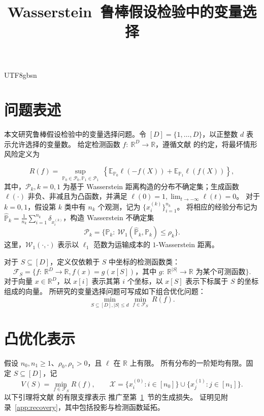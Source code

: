 \documentclass[11pt,a4paper]{article}
\title{\mbox{Wasserstein 鲁棒假设检验中的变量选择}}
\author{}
\date{}
\makeatletter
\theoremstyle{plain}
\renewcommand{\maketitle}{
\begin{center}
{\Large\bfseries\@title\par}
\end{center}\vspace{2pt}}
\makeatother
\begin{document}
\begin{CJK*}{UTF8}{gbsn}
\maketitle



\section{问题表述}\label{sec:problem}

本文研究鲁棒假设检验中的变量选择问题。令 $[D]=\{1,\ldots,D\}$，以正整数 $d$ 表示允许选择的变量数。
给定检测函数 $f:~\mathbb{R}^D\to\mathbb{R}$，遵循文献 \cite{gao2018robust} 的约定，将最坏情形风险定义为


\begin{equation}\label{eq:risk}
R(f)=\sup_{\mathbb{P}_0\in\mathcal{P}_0, \mathbb{P}_1\in\mathcal{P}_1}~
\left\{\mathbb E_{\mathbb P_0}\ell(-f(X))+
       \mathbb E_{\mathbb P_1}\ell(f(X))\right\},
\end{equation}
其中，$\mathcal{P}_k, k=0,1$ 为基于 Wasserstein 距离构造的分布不确定集；生成函数 $\ell(\cdot)$ 非负、非减且为凸函数，并满足 $\ell(0)=1, \lim_{t\to-\infty}\ell(t)=0$。
对于 $k=0,1$，假设第 $k$ 类中有 $n_k$ 个观测，记为 $\{x_i^{(k)}\}_{i=1}^{n_k}$。
将相应的经验分布记为 $\widehat{\mathbb{P}}_k=\frac1{n_k}\sum_{i=1}^{n_k}\delta_{x_i^{(k)}}$，构造 Wasserstein 不确定集
\[
\mathcal{P}_k=\Big\{
\mathbb{P}_k:~\mathcal{W}_1(
\widehat{\mathbb{P}}_k, \mathbb{P}_k
)\le \rho_k
\Big\}.
\]
这里，$\mathcal{W}_1(\cdot,\cdot)$ 表示以 $\ell_1$ 范数为运输成本的 $1$-Wasserstein 距离。


对于 $S\subseteq[D]$，定义仅依赖于 $S$ 中坐标的检测函数类：
\[
\mathcal{F}_S = \Big\{
f:~\mathbb{R}^D\to\mathbb{R}, f(x) = g(x[S])\text{，其中 $g:~\mathbb{R}^{|S|}\to\mathbb{R}$ 为某个可测函数}
\Big\}.
\]
对于向量 $x\in\mathbb{R}^D$，以 $x[i]$ 表示其第 $i$ 个坐标，以 $x[S]$ 表示下标属于 $S$ 的坐标组成的向量。
所研究的变量选择问题可写成如下组合优化问题：
\begin{equation}
\min_{S\subseteq[D], |S|\le d}\min_{f\in\mathcal{F}_S}~R(f).
\end{equation}

\section{凸优化表示}\label{sec:finite}
假设 $n_0,n_1\ge1$、$\rho_0,\rho_1>0$，且 $\ell$ 在 $\mathbb R$ 上有限。
所有分布的一阶矩均有限。固定 $S\subseteq[D]$，记
\[
V(S)=\min_{f\in\mathcal F_S}R(f),\qquad
\mathcal X=\{x_i^{(0)}:i\in[n_0]\}\cup
\{x_j^{(1)}:j\in[n_1]\}.
\]
以下引理将文献 \cite[引理~2，式~(7)]{xie2021robust} 的有限支撑表示
推广至第~\ref{sec:problem}~节的生成损失。
证明见附录~\ref{app:recovery}，其中包括投影与检测函数延拓。


\end{CJK*}
\end{document}
